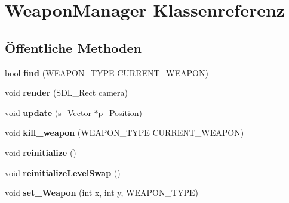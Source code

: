 \hypertarget{class_weapon_manager}{\section{Weapon\-Manager Klassenreferenz}
\label{class_weapon_manager}
}
\subsection*{Öffentliche Methoden}
\begin{DoxyCompactItemize}
\item 
\hypertarget{class_weapon_manager_ae2371fd70863bc0e51362b9798190c30}{bool {\bfseries find} (W\-E\-A\-P\-O\-N\-\_\-\-T\-Y\-P\-E C\-U\-R\-R\-E\-N\-T\-\_\-\-W\-E\-A\-P\-O\-N)}\label{class_weapon_manager_ae2371fd70863bc0e51362b9798190c30}

\item 
\hypertarget{class_weapon_manager_acb9216f61525ede5ed970b5d558db9e9}{void {\bfseries render} (S\-D\-L\-\_\-\-Rect camera)}\label{class_weapon_manager_acb9216f61525ede5ed970b5d558db9e9}

\item 
\hypertarget{class_weapon_manager_a59cc9e0d6cb21105cf00ac419ea2a573}{void {\bfseries update} (\hyperlink{structs___vector}{s\-\_\-\-Vector} $\ast$p\-\_\-\-Position)}\label{class_weapon_manager_a59cc9e0d6cb21105cf00ac419ea2a573}

\item 
\hypertarget{class_weapon_manager_a82c763fa5b480335c46a6675cd25f9e5}{void {\bfseries kill\-\_\-weapon} (W\-E\-A\-P\-O\-N\-\_\-\-T\-Y\-P\-E C\-U\-R\-R\-E\-N\-T\-\_\-\-W\-E\-A\-P\-O\-N)}\label{class_weapon_manager_a82c763fa5b480335c46a6675cd25f9e5}

\item 
\hypertarget{class_weapon_manager_a8d7e4a4638847ef3c39323a37dddd616}{void {\bfseries reinitialize} ()}\label{class_weapon_manager_a8d7e4a4638847ef3c39323a37dddd616}

\item 
\hypertarget{class_weapon_manager_a664a807d1f7599532affec338b3a868a}{void {\bfseries reinitialize\-Level\-Swap} ()}\label{class_weapon_manager_a664a807d1f7599532affec338b3a868a}

\item 
\hypertarget{class_weapon_manager_a6213a907c477df0f032ac4ebc8dd810d}{void {\bfseries set\-\_\-\-Weapon} (int x, int y, W\-E\-A\-P\-O\-N\-\_\-\-T\-Y\-P\-E)}\label{class_weapon_manager_a6213a907c477df0f032ac4ebc8dd810d}


\end{DoxyCompactItemize}
